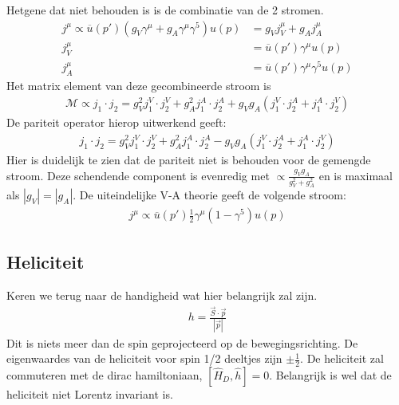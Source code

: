 \documentclass[../main.tex]{subfiles}
\begin{document}
Hetgene dat niet behouden is is de combinatie van de 2 stromen.
\begin{equation}
    \begin{aligned}
        \label{eq:stromen_v-a}
        j^\mu \propto \overline u (p') (g_V\gamma^\mu+g_A\gamma^\mu\gamma^5)u(p) &= g_Vj_V^\mu + g_Aj_A^\mu\\
        j_V^\mu &= \overline u(p')\gamma^\mu u(p)\\
        j_A^\mu &= \overline u(p')\gamma^\mu\gamma^5 u(p)
    \end{aligned}
\end{equation}
Het matrix element van deze gecombineerde stroom is
\begin{equation}
    \begin{aligned}
        \label{eq:v-a_matrix_el}
        \mathcal{M} \propto j_1\cdot j_2 = g_V^2j_1^V\cdot j_2^V + g_A^2j_1^A\cdot j_2^A + g_Vg_A(j_1^V\cdot j_2^A+j_1^A\cdot j_2^V)
    \end{aligned}
\end{equation}
De pariteit operator hierop uitwerkend geeft:
\begin{equation}
    \begin{aligned}
        \label{eq:v-a_stromen_par}
        j_1\cdot j_2 = g_V^2j_1^V\cdot j_2^V + g_A^2j_1^A\cdot j_2^A - g_Vg_A(j_1^V\cdot j_2^A+j_1^A\cdot j_2^V)
    \end{aligned}
\end{equation}
Hier is duidelijk te zien dat de pariteit niet is behouden voor de gemengde stroom. Deze schendende component is evenredig met $\propto \frac{g_Vg_A}{g_V^2+g_A^2}$ en is maximaal als $|g_V|=|g_A|$. De uiteindelijke V-A theorie geeft de volgende stroom:
\begin{equation}
    \begin{aligned}
        \label{eq:v-a_stromen_theorie}
        j^\mu \propto \overline u(p') \frac{1}{2} \gamma^\mu (1-\gamma^5)u(p)
    \end{aligned}
\end{equation}

\subsection{Heliciteit}%
\label{sub:heliciteit}

Keren we terug naar de handigheid wat hier belangrijk zal zijn.
\begin{equation}
    \begin{aligned}
        \label{eq:handigheid}
        h = \frac{\vec{S} \cdot \vec{p}}{|\vec{p}|} 
    \end{aligned}
\end{equation}
Dit is niets meer dan de spin geprojecteerd op de bewegingsrichting. De eigenwaardes van de heliciteit voor spin 1/2 deeltjes zijn $\pm \frac{1}{2}$. De heliciteit zal commuteren met de dirac hamiltoniaan, $[\hat{H}_D, \hat{h}]=0$. Belangrijk is wel dat de heliciteit niet Lorentz invariant is.
\end{document}

